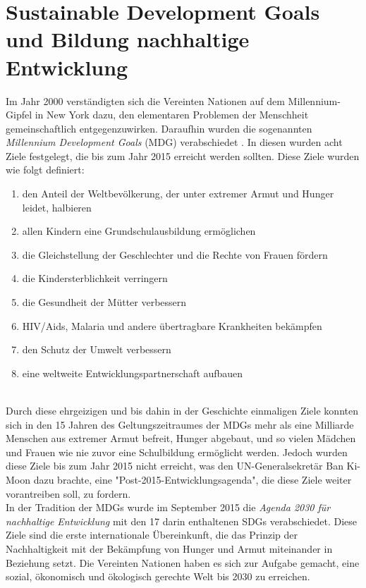 \documentclass[letterpaper]{article}
\begin{document}
\clearpage

\section{Sustainable Development Goals und Bildung nachhaltige Entwicklung}
Im Jahr 2000 verständigten sich die Vereinten Nationen auf dem Millennium-Gipfel in New York dazu, den elementaren Problemen der Menschheit gemeinschaftlich entgegenzuwirken. Daraufhin wurden die sogenannten \textit{Millennium Development Goals} (MDG) verabschiedet \cite{BMZ}. In diesen wurden acht Ziele festgelegt, die bis zum Jahr 2015 erreicht werden sollten. Diese Ziele wurden wie folgt definiert: 

\begin{enumerate}
    \item den Anteil der Weltbevölkerung, der unter extremer Armut und Hunger leidet, halbieren
    \item allen Kindern eine Grundschulausbildung ermöglichen
    \item die Gleichstellung der Geschlechter und die Rechte von Frauen fördern
    \item die Kindersterblichkeit verringern
    \item die Gesundheit der Mütter verbessern
    \item HIV/Aids, Malaria und andere übertragbare Krankheiten bekämpfen
    \item den Schutz der Umwelt verbessern
    \item eine weltweite Entwicklungspartnerschaft aufbauen
\end{enumerate}\\
Durch diese ehrgeizigen und bis dahin in der Geschichte einmaligen Ziele konnten sich in den 15 Jahren des Geltungszeitraumes der MDGs mehr als eine Milliarde Menschen aus extremer Armut befreit, Hunger abgebaut, und so vielen Mädchen und Frauen wie nie zuvor eine Schulbildung ermöglicht werden. Jedoch wurden diese Ziele bis zum Jahr 2015 nicht erreicht, was den UN-Generalsekretär Ban Ki-Moon dazu brachte, eine "Post-2015-Entwicklungsagenda", die diese Ziele weiter vorantreiben soll, zu fordern\cite{UN}.\\
In der Tradition der MDGs wurde im September 2015 die \textit{Agenda 2030 für nachhaltige Entwicklung} mit den 17 darin enthaltenen SDGs verabschiedet. Diese Ziele sind die erste internationale Übereinkunft, die das Prinzip der Nachhaltigkeit mit der Bekämpfung von Hunger und Armut miteinander in Beziehung setzt\cite{BMZ}. Die Vereinten Nationen haben es sich zur Aufgabe gemacht, eine sozial, ökonomisch und ökologisch gerechte Welt bis 2030 zu erreichen.\\
\end{document}
